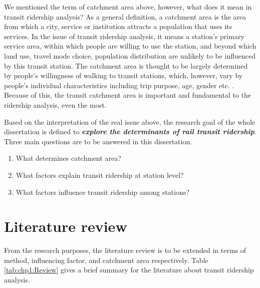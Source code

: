 We mentioned the term of catchment area above, however, what does it mean in transit ridership analysis? As a general definition, a catchment area is the area from which a city, service or institution attracts a population that uses its services. In the issue of transit ridership analysis, it means a station's primary service area, within which people are willing to use the station, and beyond which land use, travel mode choice, population distribution are unlikely to be influenced by this transit station. The catchment area is thought to be largely determined by people's willingness of walking to transit stations, which, however, vary by people's individual characteristics including trip purpose, age, gender etc. \cite{guerra2013half}. Because of this, the transit catchment area is important and fundamental to the ridership analysis, even the most.

Based on the interpretation of the real issue above, the research goal of the whole dissertation is defined to \emph{\textbf{explore the determinants of rail transit ridership}}. Three main questions are to be answered in this dissertation.

\begin{enumerate}
	\setlength{\parskip}{0\baselineskip} %
	\item What determines catchment area?
	\item What factors explain transit ridership at station level?
	\item What factors influence transit ridership among stations?
	\setlength{\parskip}{0.7\baselineskip} %
\end{enumerate}

%
\section{Literature review} 
From the research purposes, the literature review is to be extended in terms of method, influencing factor, and catchment area respectively. Table \ref{tab:chp1:Review} gives a brief summary for the literature about transit ridership analysis.

